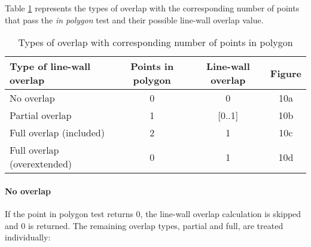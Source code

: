 	Table \ref{tab:lwatypes} represents the types of overlap with the corresponding number of points
	that pass the \emph{in polygon} test and their possible line-wall overlap
	value.\\ 

	\begin{table}[ht]
		\caption{Types of overlap with corresponding number of points in polygon}
		\label{tab:lwatypes}

		\begin{tabular}{|l||c|c|c|}
		\hline
		Type of line-wall overlap 			&	Points in polygon 			& Line-wall overlap & Figure \\
		\hline
		\hline
		No overlap					&	0					& 0		& 10a\\
		\hline
		Partial overlap 				&	1					& [0..1]	& 10b\\
		\hline
		Full overlap (included)		&	2					& 1		& 10c\\
		\hline
		Full overlap (overextended)		&  	0					& 1 		& 10d\\
		\hline
		\end{tabular}
	\end{table}

	\paragraph{No overlap}
	If the point in polygon test returns 0, the line-wall overlap calculation
	is skipped and 0 is returned. The remaining overlap types, partial and full,
	are treated individually:\\


